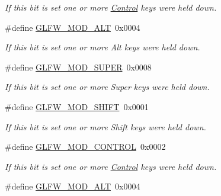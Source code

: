 \begin{DoxyCompactItemize}
\begin{DoxyCompactList}\small\item\em If this bit is set one or more \hyperlink{classControl}{Control} keys were held down. \end{DoxyCompactList}\item 
\mbox{\label{group__mods_gad2acd5633463c29e07008687ea73c0f4}} 
\#define \hyperlink{group__mods_gad2acd5633463c29e07008687ea73c0f4}{G\+L\+F\+W\+\_\+\+M\+O\+D\+\_\+\+A\+LT}~0x0004
\begin{DoxyCompactList}\small\item\em If this bit is set one or more Alt keys were held down. \end{DoxyCompactList}\item 
\mbox{\label{group__mods_ga6b64ba10ea0227cf6f42efd0a220aba1}} 
\#define \hyperlink{group__mods_ga6b64ba10ea0227cf6f42efd0a220aba1}{G\+L\+F\+W\+\_\+\+M\+O\+D\+\_\+\+S\+U\+P\+ER}~0x0008
\begin{DoxyCompactList}\small\item\em If this bit is set one or more Super keys were held down. \end{DoxyCompactList}\item 
\mbox{\label{group__mods_ga14994d3196c290aaa347248e51740274}} 
\#define \hyperlink{group__mods_ga14994d3196c290aaa347248e51740274}{G\+L\+F\+W\+\_\+\+M\+O\+D\+\_\+\+S\+H\+I\+FT}~0x0001
\begin{DoxyCompactList}\small\item\em If this bit is set one or more Shift keys were held down. \end{DoxyCompactList}\item 
\mbox{\label{group__mods_ga6ed94871c3208eefd85713fa929d45aa}} 
\#define \hyperlink{group__mods_ga6ed94871c3208eefd85713fa929d45aa}{G\+L\+F\+W\+\_\+\+M\+O\+D\+\_\+\+C\+O\+N\+T\+R\+OL}~0x0002
\begin{DoxyCompactList}\small\item\em If this bit is set one or more \hyperlink{classControl}{Control} keys were held down. \end{DoxyCompactList}\item 
\mbox{\label{group__mods_gad2acd5633463c29e07008687ea73c0f4}} 
\#define \hyperlink{group__mods_gad2acd5633463c29e07008687ea73c0f4}{G\+L\+F\+W\+\_\+\+M\+O\+D\+\_\+\+A\+LT}~0x0004

\end{DoxyCompactItemize}
